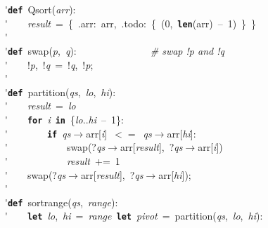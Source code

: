 \'\>\texttt{\textbf{def}}~Qsort(\textit{arr}):\\

\'\>~~~~\textit{result}~=~\{~.arr:~arr,~.todo:~\{~(0,~\texttt{\textbf{len}}(arr)~--~1)~\}~\}\\

\'\>\\

\'\>\texttt{\textbf{def}}~swap(\textit{p},~\textit{q}):~~~~~~~~~~~~~~~\emph{\# swap !p and !q}\\

\'\>~~~~!\textit{p},~!\textit{q}~=~!\textit{q},~!\textit{p};~\\

\'\>\\

\'\>\texttt{\textbf{def}}~partition(\textit{qs},~\textit{lo},~\textit{hi}):\\

\'\>~~~~\textit{result}~=~\textit{lo}\\

\'\>~~~~\texttt{\textbf{for}}~\textit{i}~\texttt{\textbf{in}}~\{\textit{lo}..\textit{hi}~--~1\}:\\

\'\>~~~~~~~~\texttt{\textbf{if}}~\textit{qs}$\rightarrow$arr[\textit{i}]~$<=$~\textit{qs}$\rightarrow$arr[\textit{hi}]:\\

\'\>~~~~~~~~~~~~swap(?\textit{qs}$\rightarrow$arr[\textit{result}],~?\textit{qs}$\rightarrow$arr[\textit{i}])\\

\'\>~~~~~~~~~~~~\textit{result}~+=~1\\

\'\>~~~~swap(?\textit{qs}$\rightarrow$arr[\textit{result}],~?\textit{qs}$\rightarrow$arr[\textit{hi}]);~\\

\'\>\\

\'\>\texttt{\textbf{def}}~sortrange(\textit{qs},~\textit{range}):\\

\'\>~~~~\texttt{\textbf{let}}~\textit{lo},~\textit{hi}~=~\textit{range}~\texttt{\textbf{let}}~\textit{pivot}~=~partition(\textit{qs},~\textit{lo},~\textit{hi}):\\

